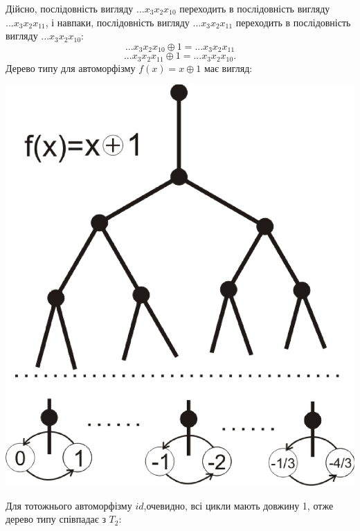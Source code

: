 \documentclass[a4paper,12pt]{article} \usepackage{a4wide}
\numberwithin{equation}{subsection}
\begin{document}
Дійсно, послідовність вигляду $...x_3x_2x_10$ переходить в послідовність вигляду $...x_3x_2x_11$, і навпаки, послідовність вигляду $...x_3x_2x_11$ переходить в послідовність вигляду $...x_3x_2x_10$:
$$...x_3x_2x_10\oplus 1=...x_3x_2x_11$$
$$...x_3x_2x_11\oplus 1=...x_3x_2x_10.$$
 Дерево типу для автоморфізму $f(x)=x\oplus 1$
має вигляд:

\begin{center}
\includegraphics[scale=0.5]{Typesigm.eps}
\end{center}



Для тотожнього автоморфізму $id$,очевидно, всі цикли мають довжину 1, отже дерево типу співпадає з $T_2$:
\end{document}
